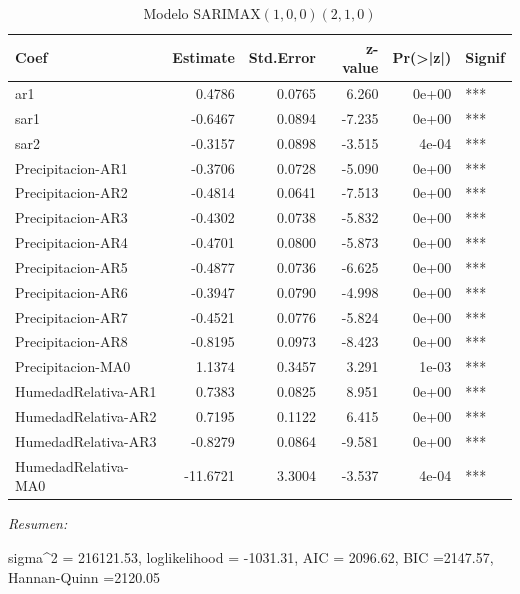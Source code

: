 \documentclass[12pt,oneside]{book}\usepackage[]{graphicx}\usepackage[]{color}
\newenvironment{knitrout}{}{} %
\theoremstyle{definition} %
\begin{document}
\begin{knitrout}
\begin{table}
\caption{\label{tab:unnamed-chunk-53}\label{tab:sarimax_estim2}Modelo SARIMAX$(1,0,0)(2,1,0)$}
\centering
\begin{threeparttable}
\begin{tabular}[t]{lrrrrl}
\toprule
Coef & Estimate & Std.Error & z-value & Pr(>|z|) & Signif\\
\midrule
\rowcolor{gray!6}  ar1 & 0.4786 & 0.0765 & 6.260 & 0e+00 & ***\\
sar1 & -0.6467 & 0.0894 & -7.235 & 0e+00 & ***\\
\rowcolor{gray!6}  sar2 & -0.3157 & 0.0898 & -3.515 & 4e-04 & ***\\
Precipitacion-AR1 & -0.3706 & 0.0728 & -5.090 & 0e+00 & ***\\
\rowcolor{gray!6}  Precipitacion-AR2 & -0.4814 & 0.0641 & -7.513 & 0e+00 & ***\\
\addlinespace
Precipitacion-AR3 & -0.4302 & 0.0738 & -5.832 & 0e+00 & ***\\
\rowcolor{gray!6}  Precipitacion-AR4 & -0.4701 & 0.0800 & -5.873 & 0e+00 & ***\\
Precipitacion-AR5 & -0.4877 & 0.0736 & -6.625 & 0e+00 & ***\\
\rowcolor{gray!6}  Precipitacion-AR6 & -0.3947 & 0.0790 & -4.998 & 0e+00 & ***\\
Precipitacion-AR7 & -0.4521 & 0.0776 & -5.824 & 0e+00 & ***\\
\addlinespace
\rowcolor{gray!6}  Precipitacion-AR8 & -0.8195 & 0.0973 & -8.423 & 0e+00 & ***\\
Precipitacion-MA0 & 1.1374 & 0.3457 & 3.291 & 1e-03 & ***\\
\rowcolor{gray!6}  HumedadRelativa-AR1 & 0.7383 & 0.0825 & 8.951 & 0e+00 & ***\\
HumedadRelativa-AR2 & 0.7195 & 0.1122 & 6.415 & 0e+00 & ***\\
\rowcolor{gray!6}  HumedadRelativa-AR3 & -0.8279 & 0.0864 & -9.581 & 0e+00 & ***\\
\addlinespace
HumedadRelativa-MA0 & -11.6721 & 3.3004 & -3.537 & 4e-04 & ***\\
\bottomrule
\end{tabular}
\begin{tablenotes}
\item \textit{Resumen:} 
\item sigma\textasciicircum{}2 = 216121.53, loglikelihood = -1031.31, AIC = 2096.62, BIC =2147.57, Hannan-Quinn =2120.05
\end{tablenotes}
\end{threeparttable}
\end{table}


\end{knitrout}
\end{document}
